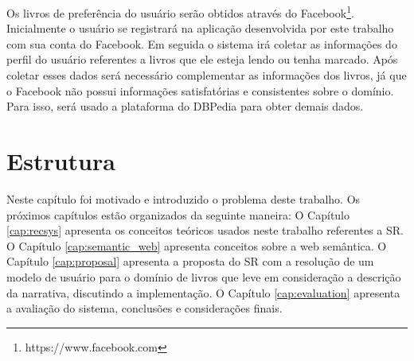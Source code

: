 Os livros de preferência do usuário serão obtidos através do Facebook\footnote{https://www.facebook.com}. Inicialmente o usuário se registrará na aplicação desenvolvida por este trabalho com sua conta do Facebook. Em seguida o sistema irá coletar as informações do perfil do usuário referentes a livros que ele esteja lendo ou tenha marcado. Após coletar esses dados será necessário complementar as informações dos livros, já que o Facebook não possui informações satisfatórias e consistentes sobre o domínio. Para isso, será usado a plataforma do DBPedia para obter demais dados.

\section{Estrutura}
Neste capítulo foi motivado e introduzido o problema deste trabalho. Os próximos capítulos estão organizados da seguinte maneira: O Capítulo \ref{cap:recsys} apresenta os conceitos teóricos usados neste trabalho referentes a SR. O Capítulo \ref{cap:semantic_web} apresenta conceitos sobre a web semântica. O Capítulo \ref{cap:proposal} apresenta a proposta do SR com a resolução de um modelo de usuário para o domínio de livros que leve em consideração a descrição da narrativa, discutindo a implementação. O Capítulo \ref{cap:evaluation} apresenta a avaliação do sistema, conclusões e considerações finais.